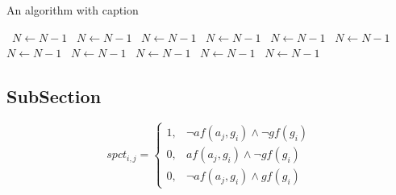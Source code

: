 \documentclass[a4paper]{article}
\begin{document}
\begin{algorithm}
\caption{An algorithm with caption}
\begin{algorithmic}
\    \State $N \gets N - 1$
\    \State $N \gets N - 1$
\    \State $N \gets N - 1$
\    \State $N \gets N - 1$
\    \State $N \gets N - 1$
\    \State $N \gets N - 1$
\    \State $N \gets N - 1$
\    \State $N \gets N - 1$
\    \State $N \gets N - 1$
\    \State $N \gets N - 1$
\    \State $N \gets N - 1$
\EndWhile
\end{algorithmic}
\end{algorithm}

\subsection{SubSection}

\begin{equation}
spct_{i,j} =
\begin{cases}
1, & \text{$\neg af(a_j,g_i) \wedge \neg gf(g_i)$}\\
0, & \text{$af(a_j,g_i) \wedge \neg gf(g_i)$}\\
0, & \text{$\neg af(a_j,g_i) \wedge gf(g_i)$}
\end{cases}
\end{equation}
\end{document}
